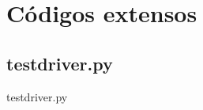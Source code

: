 \documentclass[12pt,a4paper,twoside]{report}
\begin{document}
\clearpage
{}
\appendix

\chapter{Códigos extensos \label{ap:testdriver}}
\section{testdriver.py}
 {testdriver.py}
\end{document}
